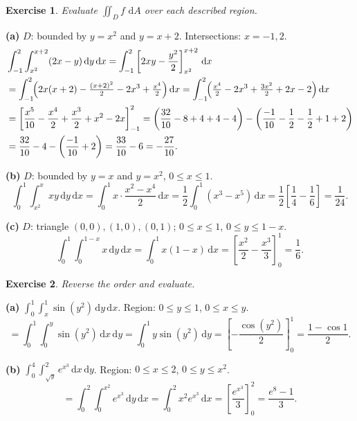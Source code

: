 \documentclass[12pt,a4paper]{article}
\theoremstyle{exstyle}
\newtheorem{exercise}{Exercise}[section]
\newcommand{\dif}[1]{\,\mathrm{d}#1}
\begin{document}
\begin{exercise}
Evaluate $\iint_D f\,\dif{A}$ over each described region.
\end{exercise}
\begin{solbox}
\textbf{(a)} $D$: bounded by $y=x^2$ and $y=x+2$. Intersections: $x=-1,2$.
\begin{align*}
  &\int_{-1}^2\int_{x^2}^{x+2}(2x-y)\dif{y}\dif{x}
  =\int_{-1}^2\left[2xy-\frac{y^2}{2}\right]_{x^2}^{x+2}\dif{x}\\
  &=\int_{-1}^2\!\Bigl(2x(x+2)-\tfrac{(x+2)^2}{2}-2x^3+\tfrac{x^4}{2}\Bigr)\dif{x}
  =\int_{-1}^2\!\Bigl(\tfrac{x^4}{2}-2x^3+\tfrac{3x^2}{2}+2x-2\Bigr)\dif{x}\\
  &=\left[\frac{x^5}{10}-\frac{x^4}{2}+\frac{x^3}{2}+x^2-2x\right]_{-1}^2
  =\left(\frac{32}{10}-8+4+4-4\right)-\left(\frac{-1}{10}-\frac{1}{2}-\frac{1}{2}+1+2\right)\\
  &=\frac{32}{10}-4-\left(\frac{-1}{10}+2\right)
  =\frac{33}{10}-6=-\frac{27}{10}.
\end{align*}

\textbf{(b)} $D$: bounded by $y=x$ and $y=x^2$, $0\le x\le1$.
\[
  \int_0^1\int_{x^2}^x xy\dif{y}\dif{x}=\int_0^1 x\cdot\frac{x^2-x^4}{2}\dif{x}
  =\frac{1}{2}\int_0^1(x^3-x^5)\dif{x}=\frac{1}{2}\left[\frac{1}{4}-\frac{1}{6}\right]=\frac{1}{24}.
\]

\textbf{(c)} $D$: triangle $(0,0),(1,0),(0,1)$; $0\le x\le1$, $0\le y\le1-x$.
\[
  \int_0^1\int_0^{1-x}x\dif{y}\dif{x}=\int_0^1 x(1-x)\dif{x}=\left[\frac{x^2}{2}-\frac{x^3}{3}\right]_0^1=\frac{1}{6}.
\]
\end{solbox}

\begin{exercise}
Reverse the order and evaluate.
\end{exercise}
\begin{solbox}
\textbf{(a)} $\int_0^1\int_x^1\sin(y^2)\dif{y}\dif{x}$.
Region: $0\le y\le1$, $0\le x\le y$.
\[
  =\int_0^1\int_0^y\sin(y^2)\dif{x}\dif{y}=\int_0^1 y\sin(y^2)\dif{y}
  =\left[-\frac{\cos(y^2)}{2}\right]_0^1=\frac{1-\cos1}{2}.
\]

\textbf{(b)} $\int_0^4\int_{\sqrt{y}}^2 e^{x^3}\dif{x}\dif{y}$.
Region: $0\le x\le2$, $0\le y\le x^2$.
\[
  =\int_0^2\int_0^{x^2}e^{x^3}\dif{y}\dif{x}=\int_0^2 x^2e^{x^3}\dif{x}
  =\left[\frac{e^{x^3}}{3}\right]_0^2=\frac{e^8-1}{3}.
\]
\end{solbox}
\end{document}
